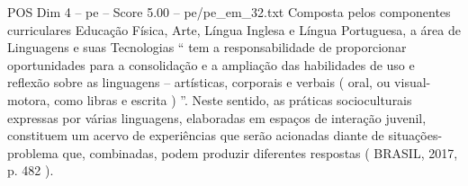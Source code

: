 \begin{textsample}{POS Dim 4 – pe – Score 5.00 – pe/pe\_em\_32.txt}
Composta pelos componentes curriculares Educação Física, Arte, Língua Inglesa e Língua Portuguesa, a área de Linguagens e suas Tecnologias “ tem a responsabilidade de proporcionar oportunidades para a consolidação e a ampliação das habilidades de uso e reflexão sobre as linguagens – artísticas, corporais e verbais ( oral, ou visual-motora, como libras e escrita ) ”.
Neste sentido, as práticas socioculturais expressas por várias linguagens, elaboradas em espaços de interação juvenil, constituem um acervo de experiências que serão acionadas diante de situações-problema que, combinadas, podem produzir diferentes respostas ( BRASIL, 2017, p. 482 ).

\end{textsample}
